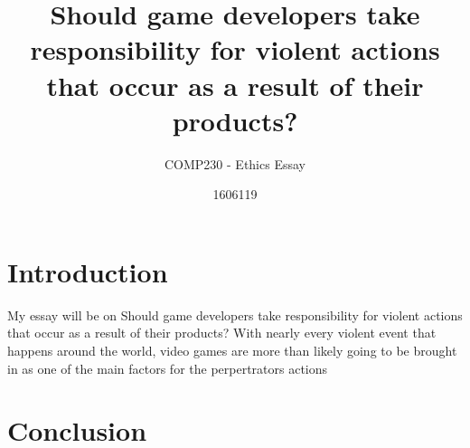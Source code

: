 \documentclass{scrartcl}
\title{Should game developers take responsibility for violent actions that occur as a result of their products?}
\subtitle{COMP230 - Ethics Essay}
\author{1606119}
\begin{document}
\maketitle

\abstract{} 

\section{Introduction}
My essay will be on Should game developers take responsibility for violent actions that occur as a result of their products? With nearly every violent event that happens around the world, video games are more than likely going to be brought in as one of the main factors for the perpertrators actions



\section{}



\section{}



\section{Conclusion}










\end{document}
